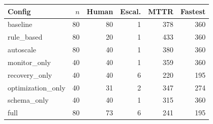 \begin{tabular}{lrrrrr}
\toprule
Config & $n$ & Human & Escal. & MTTR & Fastest \\
\midrule
baseline & 80 & 80 & 1 & 378 & 360 \\
rule\_based & 80 & 20 & 1 & 433 & 360 \\
autoscale & 80 & 40 & 1 & 380 & 360 \\
monitor\_only & 40 & 40 & 1 & 359 & 360 \\
recovery\_only & 40 & 40 & 6 & 220 & 195 \\
optimization\_only & 40 & 31 & 2 & 347 & 274 \\
schema\_only & 40 & 40 & 1 & 315 & 360 \\
full & 80 & 73 & 6 & 241 & 195 \\
\bottomrule
\end{tabular}
